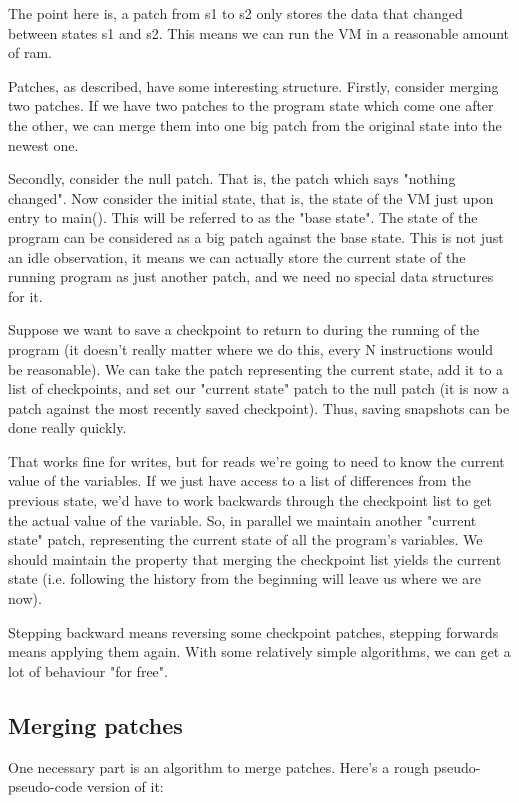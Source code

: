 \documentclass[10pt,a4paper]{report}
\begin{document}
The point here is, a patch from s1 to s2 only stores the data that changed between states s1 and s2. This means we can run the VM in a reasonable amount of ram.

Patches, as described, have some interesting structure. Firstly, consider merging two patches. If we have two patches to the program state which come one after the other, we can merge them into one big patch from the original state into the newest one.

Secondly, consider the null patch. That is, the patch which says "nothing changed". Now consider the initial state, that is, the state of the VM just upon entry to main(). This will be referred to as the "base state". The state of the program can be considered as a big patch against the base state. This is not just an idle observation, it means we can actually store the current state of the running program as just another patch, and we need no special data structures for it.

Suppose we want to save a checkpoint to return to during the running of the program (it doesn't really matter where we do this, every N instructions would be reasonable). We can take the patch representing the current state, add it to a list of checkpoints, and set our "current state" patch to the null patch (it is now a patch against the most recently saved checkpoint). Thus, saving snapshots can be done really quickly.

That works fine for writes, but for reads we're going to need to know the current value of the variables. If we just have access to a list of differences from the previous state, we'd have to work backwards through the checkpoint list to get the actual value of the variable. So, in parallel we maintain another "current state" patch, representing the current state of all the program's variables. We should maintain the property that merging the checkpoint list yields the current state (i.e. following the history from the beginning will leave us where we are now).

Stepping backward means reversing some checkpoint patches, stepping forwards means applying them again. With some relatively simple algorithms, we can get a lot of behaviour "for free".

\subsection{Merging patches}
One necessary part is an algorithm to merge patches. Here's a rough pseudo-pseudo-code version of it:
\end{document}
